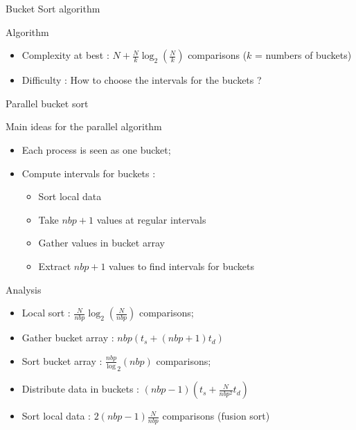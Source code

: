 \documentclass[compress,10pt,aspectratio=169]{beamer}
\begin{document}
\begin{frame}[fragile]{Bucket Sort algorithm}
\begin{block}{Algorithm}
\begin{figure}
\end{figure}
\begin{itemize}
    \item Complexity at best : $N + \frac{N}{k}\log_{2}(\frac{N}{k})$ comparisons ($k$ = numbers of buckets)
    \item \alert{Difficulty} : How to choose the intervals for the buckets ?
\end{itemize}
\end{block}

\end{frame}

\begin{frame}[fragile]{Parallel bucket sort}
    \scriptsize
    \begin{multicols}{2}
    \begin{block}{\small Main ideas for the parallel algorithm}
        \begin{itemize}
            \item Each process is seen as one bucket;
            \item Compute intervals for buckets :
            \begin{itemize}
                \item {\scriptsize Sort local data}
                \item {\scriptsize Take $nbp+1$ values at regular intervals}
                \item {\scriptsize Gather values in bucket array}
                \item {\scriptsize Extract $nbp+1$ values to find intervals for buckets}
            \end{itemize}
        \end{itemize}
    \end{block}

    \begin{exampleblock}{\small Analysis}
        \begin{itemize}
            \item Local sort : $\frac{N}{nbp}\log_{2}(\frac{N}{nbp})$ comparisons;
            \item Gather bucket array : $nbp(t_{s} + (nbp+1)t_{d})$
            \item Sort bucket array : $\frac{nbp}\log_{2}(nbp)$ comparisons;
            \item Distribute data in buckets : $(nbp-1)\left(t_{s} + \frac{N}{nbp^{2}}t_{d}\right)$
            \item Sort local data : $2(nbp-1)\frac{N}{nbp}$ comparisons (fusion sort)
        \end{itemize}
    \end{exampleblock}
\end{multicols}
\end{frame}
\end{document}
